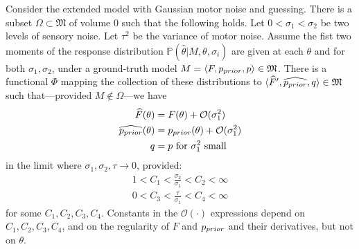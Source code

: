 \begin{thm}
Consider the extended model with Gaussian motor noise and guessing.
There is a subset $\Omega \subset \mathfrak{M}$ of volume $0$ such that the following holds.
Let $0 < \sigma_1 < \sigma_2$ be two levels of sensory noise. Let $\tau^2$ be the variance of motor noise.
Assume the fist two moments of the response distribution $\mathbb{P}(\widehat{\theta}|M,\theta, \sigma_i)$ are given at each $\theta$ and for both $\sigma_1, \sigma_2$, under a ground-truth model $M = \langle F, p_{prior},p \rangle \in \mathfrak{M}$.
There is a functional $\Phi$ mapping the collection of these distributions to $\langle \widehat{F}', \widehat{p_{prior}},q \rangle \in \mathfrak{M}$
such that---provided $M \not\in \Omega$---we have
\begin{align*}
    \widehat{F}(\theta) &= F(\theta) + \mathcal{O}(\sigma_1^2) \\
    \widehat{p_{prior}}(\theta) &= p_{prior}(\theta) + \mathcal{O}(\sigma_1^2) \\
    q &= p  \text{ for $\sigma_1^2$ small}
\end{align*}
in the limit where $\sigma_1, \sigma_2, \tau \rightarrow 0$, provided: 
\begin{align*}
1 < C_1 < \frac{\sigma_2}{\sigma_1} < C_2 < \infty     \\
0 < C_3 < \frac{\tau}{\sigma_1} < C_4 < \infty
\end{align*}
for some $C_1, C_2, C_3, C_4$.
Constants in the $\mathcal{O}(\cdot)$ expressions depend on $C_1, C_2, C_3, C_4$, and on the regularity of $F$ and $p_{prior}$ and their derivatives, but not on $\theta$.
\end{thm}



